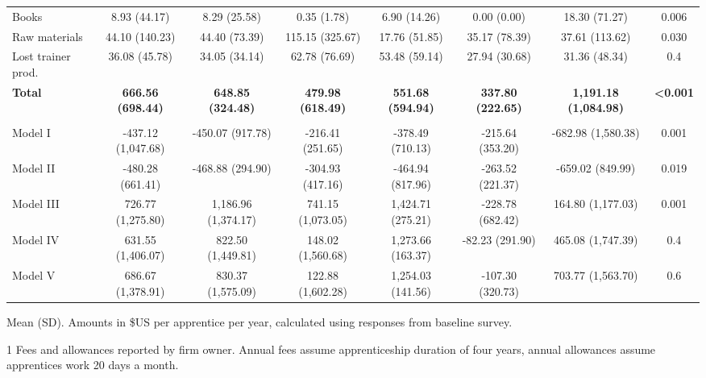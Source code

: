 \documentclass[
  11pt,
a4paper
]{article}
\begin{document}
\begin{landscape}
\begin{table}[H]
{\begin{threeparttable}
\begin{tabular}[t]{lccccccc}
\hspace{1em}\hspace{1em}Books & 8.93 (44.17) & 8.29 (25.58) & 0.35 (1.78) & 6.90 (14.26) & 0.00 (0.00) & 18.30 (71.27) & 0.006\\
\hspace{1em}\hspace{1em}Raw materials & 44.10 (140.23) & 44.40 (73.39) & 115.15 (325.67) & 17.76 (51.85) & 35.17 (78.39) & 37.61 (113.62) & 0.030\\
\hspace{1em}Lost trainer prod. & 36.08 (45.78) & 34.05 (34.14) & 62.78 (76.69) & 53.48 (59.14) & 27.94 (30.68) & 31.36 (48.34) & 0.4\\
\textbf{\hspace{1em}Total} & \textbf{666.56 (698.44)} & \textbf{648.85 (324.48)} & \textbf{479.98 (618.49)} & \textbf{551.68 (594.94)} & \textbf{337.80 (222.65)} & \textbf{1,191.18 (1,084.98)} & \textbf{<0.001}\\
\addlinespace[0.3em]
\multicolumn{8}{l}{\textbf{Net Benefits}}\\
\hspace{1em}Model I & -437.12 (1,047.68) & -450.07 (917.78) & -216.41 (251.65) & -378.49 (710.13) & -215.64 (353.20) & -682.98 (1,580.38) & 0.001\\
\hspace{1em}Model II & -480.28 (661.41) & -468.88 (294.90) & -304.93 (417.16) & -464.94 (817.96) & -263.52 (221.37) & -659.02 (849.99) & 0.019\\
\hspace{1em}Model III & 726.77 (1,275.80) & 1,186.96 (1,374.17) & 741.15 (1,073.05) & 1,424.71 (275.21) & -228.78 (682.42) & 164.80 (1,177.03) & 0.001\\
\hspace{1em}Model IV & 631.55 (1,406.07) & 822.50 (1,449.81) & 148.02 (1,560.68) & 1,273.66 (163.37) & -82.23 (291.90) & 465.08 (1,747.39) & 0.4\\
\hspace{1em}Model V & 686.67 (1,378.91) & 830.37 (1,575.09) & 122.88 (1,602.28) & 1,254.03 (141.56) & -107.30 (320.73) & 703.77 (1,563.70) & 0.6\\
\bottomrule
\end{tabular}
\begin{tablenotes}
\small
\item Mean (SD). Amounts in \$US per apprentice per year, calculated using responses from baseline survey.
\item[1] Fees and allowances reported by firm owner. Annual fees assume apprenticeship duration of four years, annual allowances assume apprentices work 20 days a month.
\end{tablenotes}
\end{threeparttable}}
\end{table}

\end{landscape}
\end{document}
